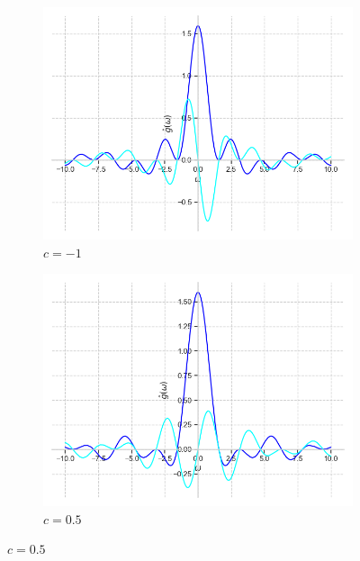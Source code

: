 \documentclass[a4paper, 16pt]{article}
\begin{document}
    \newpage
    \begin{figure}[htbp]
        \centering
        \begin{subfigure}{0.3\textwidth}
            \centering
            \includegraphics[width=\linewidth]{sh_m1_re_im_rectf_int12.png}
            \caption{$c=-1$}
            \label{fig:reimshrectf_1}
        \end{subfigure}
        \hfill
        \begin{subfigure}{0.3\textwidth}
            \centering
            \includegraphics[width=\linewidth]{sh_zp5_re_im_rectf_int12.png}
            \caption{$c=0.5$}
            \label{fig:reimshrectf_2}
        \end{subfigure}

\end{figure}
\end{document}

